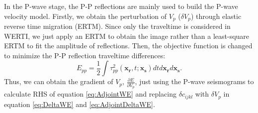 In the P-wave stage, the P-P reflections are mainly used to build the P-wave velocity
model. 
Firstly, we obtain the perturbation of $V_p$ ($\delta V_p$) through 
elastic reverse time
migration (ERTM). Since only the traveltime is considered in WERTI, we just apply an
ERTM to obtain the image rather than a least-square ERTM to fit the amplitude of
reflections. 
Then, the objective function is changed to minimize the P-P reflection traveltime differences:
\begin{equation}
	E_{pp}=\frac{1}{2}\int\tau^2_{pp}(\mathbf{x_r},t;\mathbf{x_s})dtd\mathbf{x_r}d\mathbf{x_s}.
    \label{eq:ObjectivefunctionPP} 
\end{equation}
Thus, we can obtain the gradient of  $V_p$, $\frac{\partial E}{\partial
V_p}$, just using the P-wave seismograms to
calculate RHS of equation \eqref{eq:AdjointWE} and replacing $\delta c_{ijkl}$ with
$\delta V_p$ in equation \eqref{eq:DeltaWE} and \eqref{eq:AdjointDeltaWE}.

